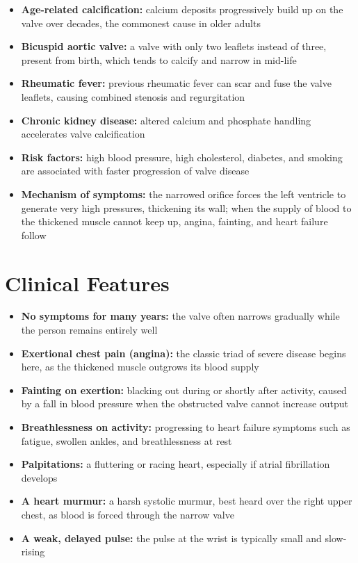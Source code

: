 \begin{itemize}
    \item \textbf{Age-related calcification:} calcium deposits progressively build up on the valve over decades, the commonest cause in older adults
    \item \textbf{Bicuspid aortic valve:} a valve with only two leaflets instead of three, present from birth, which tends to calcify and narrow in mid-life
    \item \textbf{Rheumatic fever:} previous rheumatic fever can scar and fuse the valve leaflets, causing combined stenosis and regurgitation
    \item \textbf{Chronic kidney disease:} altered calcium and phosphate handling accelerates valve calcification
    \item \textbf{Risk factors:} high blood pressure, high cholesterol, diabetes, and smoking are associated with faster progression of valve disease
    \item \textbf{Mechanism of symptoms:} the narrowed orifice forces the left ventricle to generate very high pressures, thickening its wall; when the supply of blood to the thickened muscle cannot keep up, angina, fainting, and heart failure follow
\end{itemize}

\section*{Clinical Features}
\begin{itemize}
    \item \textbf{No symptoms for many years:} the valve often narrows gradually while the person remains entirely well
    \item \textbf{Exertional chest pain (angina):} the classic triad of severe disease begins here, as the thickened muscle outgrows its blood supply
    \item \textbf{Fainting on exertion:} blacking out during or shortly after activity, caused by a fall in blood pressure when the obstructed valve cannot increase output
    \item \textbf{Breathlessness on activity:} progressing to heart failure symptoms such as fatigue, swollen ankles, and breathlessness at rest
    \item \textbf{Palpitations:} a fluttering or racing heart, especially if atrial fibrillation develops
    \item \textbf{A heart murmur:} a harsh systolic murmur, best heard over the right upper chest, as blood is forced through the narrow valve
    \item \textbf{A weak, delayed pulse:} the pulse at the wrist is typically small and slow-rising
\end{itemize}


